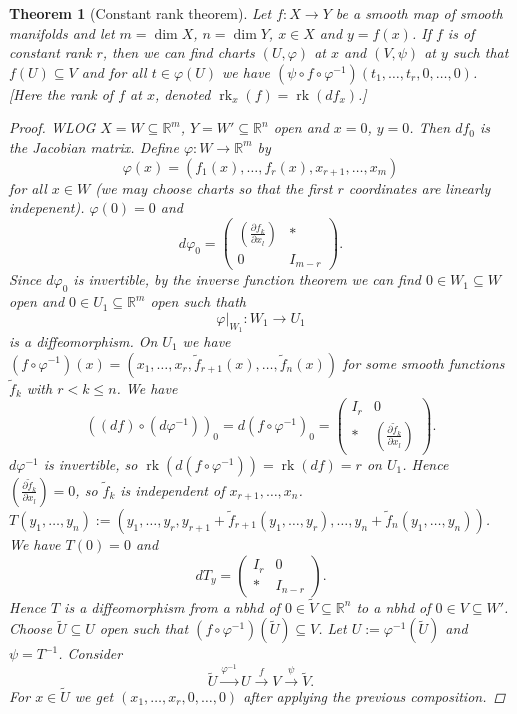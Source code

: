 \documentclass[12pt]{article}
\theoremstyle{darkgreentheorem}
\newtheorem{thm}{Theorem}[section]
\theoremstyle{darkbluedefinition}
\theoremstyle{darkredexample}
\theoremstyle{remark}
\newcommand{\R}{\mathbb{R}}
\newcommand{\1}{\mathbbm{1}}
\DeclareMathOperator{\rk}{rk}
\newcommand{\sub}{\subseteq}
\begin{document}
\begin{thm}[Constant rank theorem]
    Let $f\colon X\to Y$ be a smooth map of smooth manifolds and let $m=\dim{X}$, $n=\dim{Y}$, $x\in X$ and $y=f(x)$.
    If $f$ is of constant rank $r$, then we can find charts $(U,\varphi)$ at $x$ and $(V,\psi)$ at $y$ such that $f(U)\sub V$ and for all $t\in \varphi(U)$ we have $(\psi \circ f\circ \varphi^{-1})(t_{1},\ldots,t_{r},0,\ldots,0)$.
    [Here the rank of $f$ at $x$, denoted $\rk_{x}(f)=\rk(df_{x})$.]
    \begin{proof}
	WLOG $X=W\sub \R^{m}$, $Y=W'\sub \R^{n}$ open and $x=0$, $y=0$.
	Then $df_{0}$ is the Jacobian matrix.
	Define $\varphi \colon W\to \R^{m}$ by
	\[ \varphi(x)=(f_{1}(x),\ldots,f_{r}(x),x_{r+1},\ldots,x_{m}) \]
	for all $x\in W$ (we may choose charts so that the first $r$ coordinates are linearly indepenent).
	$\varphi(0)=0$ and
	\[ d\varphi_{0}=\begin{pmatrix} \left(\frac{\partial f_{k}}{\partial x_{l}}\right) & * \\ 0 & I_{m-r} \end{pmatrix}. \]
	    Since $d\varphi_{0}$ is invertible, by the inverse function theorem we can find $0\in W_{1}\sub W$ open and $0\in U_{1}\sub \R^{m}$ open such thath
	\[ \varphi|_{W_{1}}\colon W_{1}\to U_{1} \]
	is a diffeomorphism.
	On $U_{1}$ we have $(f\circ \varphi^{-1})(x)=(x_{1},\ldots,x_{r},\tilde{f}_{r+1}(x),\ldots,\tilde{f}_{n}(x))$ for some smooth functions $\tilde{f}_{k}$ with $r<k\leqslant n$.
	We have
	\[ ((df)\circ (d\varphi^{-1}))_{0}=d(f\circ \varphi^{-1})_{0}=\begin{pmatrix} I_{r} & 0 \\ * & \left( \frac{\partial \tilde{f}_{k}}{\partial x_{l}}\right) \end{pmatrix}.\]
	$d\varphi^{-1}$ is invertible, so $\rk(d(f\circ \varphi^{-1}))=\rk(df)=r$ on $U_{1}$.
	Hence $\left(\frac{\partial \tilde{f}_{k}}{\partial x_{l}}\right) = 0 $, so $\tilde{f}_{k}$ is independent of $x_{r+1},\ldots, x_{n}$.
	$T(y_{1},\ldots,y_{n}):=(y_{1},\ldots,y_{r}, y_{r+1}+\tilde{f}_{r+1}(y_{1},\ldots,y_{r}),\ldots,y_{n}+\tilde{f}_{n}(y_{1},\ldots,y_{n}))$.
	We have $T(0)=0$ and
	\[ dT_{y}=\begin{pmatrix} I_{r} & 0 \\ * & I_{n-r}\end{pmatrix}. \]
	Hence $T$ is a diffeomorphism from a nbhd of $0\in \tilde{V}\sub \R^{n}$ to a nbhd of $0\in V\sub W'$.
	Choose $\tilde{U}\sub U$ open such that $(f\circ \varphi^{-1})(\tilde{U})\sub V$.
	Let $U:=\varphi^{-1}(\tilde{U})$ and $\psi=T^{-1}$.
	Consider
	\[ \tilde{U}\xrightarrow{\varphi^{-1}}U\xrightarrow{f}V\xrightarrow{\psi}\tilde{V}. \]
	For $x\in \tilde{U}$ we get $(x_{1},\ldots,x_{r},0,\ldots,0)$ after applying the previous composition.
    \end{proof}
\end{thm}
\end{document}

